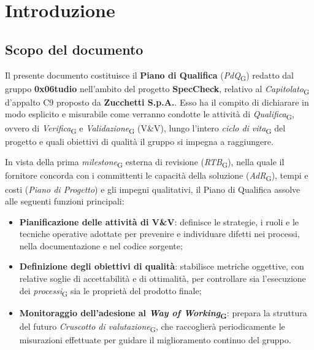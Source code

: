 \documentclass[11pt, a4paper]{article}
\newcommand{\glossario}[1]{\textit{#1}\textsubscript{G}}
\begin{document}
\newpage
\tableofcontents
\newpage
\listoffigures
\listoftables
\newpage

\section{Introduzione}

\subsection{Scopo del documento}
Il presente documento costituisce il \textbf{Piano di Qualifica} (\glossario{PdQ}) redatto dal gruppo \textbf{0x06tudio} nell'ambito del progetto \textbf{SpecCheck}, relativo al \glossario{Capitolato} d'appalto C9 proposto da \textbf{Zucchetti S.p.A.}. Esso ha il compito di dichiarare in modo esplicito e misurabile come verranno condotte le attività di \glossario{Qualifica}, ovvero di \glossario{Verifica} e \glossario{Validazione} (V\&V), lungo l'intero \glossario{ciclo di vita} del progetto e quali obiettivi di qualità il gruppo si impegna a raggiungere.

In vista della prima \glossario{milestone} esterna di revisione (\glossario{RTB}), nella quale il fornitore concorda con i committenti le capacità della soluzione (\glossario{AdR}), tempi e costi (\textit{Piano di Progetto}) e gli impegni qualitativi, il Piano di Qualifica assolve alle seguenti funzioni principali:
\begin{itemize}
    \item \textbf{Pianificazione delle attività di V\&V}: definisce le strategie, i ruoli e le tecniche operative adottate per prevenire e individuare difetti nei processi, nella documentazione e nel codice sorgente;
    \item \textbf{Definizione degli obiettivi di qualità}: stabilisce metriche oggettive, con relative soglie di accettabilità e di ottimalità, per controllare sia l'esecuzione dei \glossario{processi} sia le proprietà del prodotto finale;
    \item \textbf{Monitoraggio dell'adesione al \glossario{Way of Working}}: prepara la struttura del futuro \glossario{Cruscotto di valutazione}, che raccoglierà periodicamente le misurazioni effettuate per guidare il miglioramento continuo del gruppo.
\end{itemize}
\end{document}
